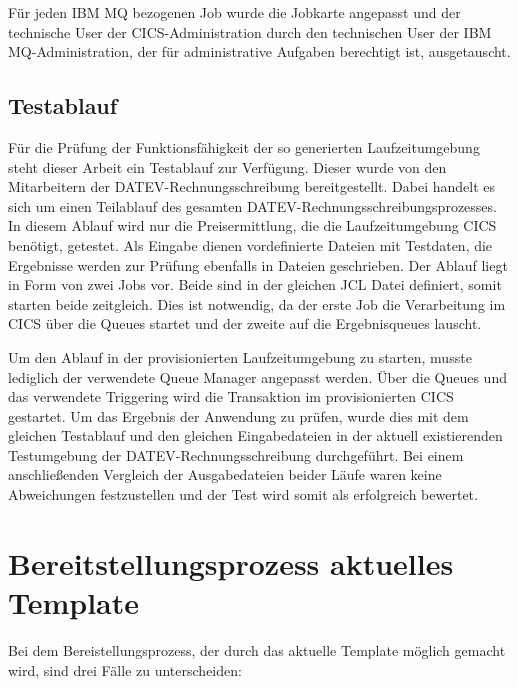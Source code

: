 \begin{minipage}{\linewidth}

\end{minipage}

Für jeden IBM MQ bezogenen Job wurde die Jobkarte angepasst und der technische User der CICS-Administration durch den technischen User der IBM MQ-Administration, der für administrative Aufgaben berechtigt ist, ausgetauscht.

\subsection{Testablauf}
Für die Prüfung der Funktionsfähigkeit der so generierten Laufzeitumgebung steht dieser Arbeit ein Testablauf zur Verfügung.
Dieser wurde von den Mitarbeitern der DATEV-Rechnungsschreibung bereitgestellt.
Dabei handelt es sich um einen Teilablauf des gesamten DATEV-Rechnungsschreibungsprozesses.
In diesem Ablauf wird nur die Preisermittlung, die die Laufzeitumgebung CICS benötigt, getestet.
Als Eingabe dienen vordefinierte Dateien mit Testdaten, die Ergebnisse werden zur Prüfung ebenfalls in Dateien geschrieben.
Der Ablauf liegt in Form von zwei Jobs vor.
Beide sind in der gleichen JCL Datei definiert, somit starten beide zeitgleich. 
Dies ist notwendig, da der erste Job die Verarbeitung im CICS über die Queues startet und der zweite auf die Ergebnisqueues lauscht.

Um den Ablauf in der provisionierten Laufzeitumgebung zu starten, musste lediglich der verwendete Queue Manager angepasst werden.
Über die Queues und das verwendete Triggering wird die Transaktion im provisionierten CICS gestartet.
Um das Ergebnis der Anwendung zu prüfen, wurde dies mit dem gleichen Testablauf und den gleichen Eingabedateien in der aktuell existierenden Testumgebung der DATEV-Rechnungsschreibung durchgeführt.
Bei einem anschließenden Vergleich der Ausgabedateien beider Läufe waren keine Abweichungen festzustellen und der Test wird somit als erfolgreich bewertet.

\section{Bereitstellungsprozess aktuelles Template}\label{sec:akttemp}
Bei dem Bereistellungsprozess, der durch das aktuelle Template möglich gemacht wird, sind drei Fälle zu unterscheiden:

